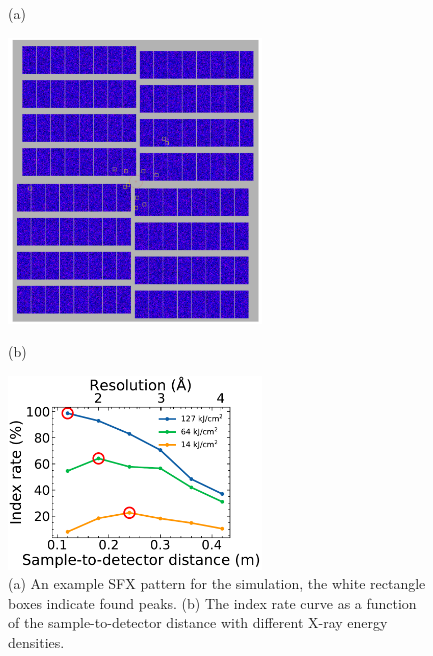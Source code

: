 \documentclass[11pt, a4paper]{article}
\begin{document}
\begin{figure}[H]
\centering
\begin{flushleft}
\LARGE{(a)}
\end{flushleft}
\includegraphics[width=0.6\textwidth]{figures/SFX_pattern.png} \\
\begin{flushleft}
\LARGE{(b)}
\end{flushleft}
\includegraphics[width=0.6\textwidth]{figures/index_rate.pdf} 
\caption 
{\label{fig:optSim}
(a) An example SFX pattern for the simulation, the white rectangle boxes indicate found peaks. (b) The index rate curve as a function of the sample-to-detector distance with different X-ray energy densities.} 
\end{figure}




\end{document}
